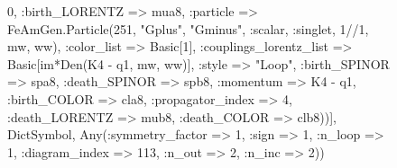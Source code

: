 \documentclass{revtex4}
\begin{document}
\begin{figure}[!htb]
\begin{center}
{0, :birth_LORENTZ => mua8, :particle => FeAmGen.Particle(251, "Gplus", "Gminus", :scalar, :singlet, 1//1, mw, ww), :color_list => Basic[1], :couplings_lorentz_list => Basic[im*Den(K4 - q1, mw, ww)], :style => "Loop", :birth_SPINOR => spa8, :death_SPINOR => spb8, :momentum => K4 - q1, :birth_COLOR => cla8, :propagator_index => 4, :death_LORENTZ => mub8, :death_COLOR => clb8))], Dict{Symbol, Any}(:symmetry_factor => 1, :sign => 1, :n_loop => 1, :diagram_index => 113, :n_out => 2, :n_inc => 2)) 
}
\end{center}
\end{figure}
\end{document}
